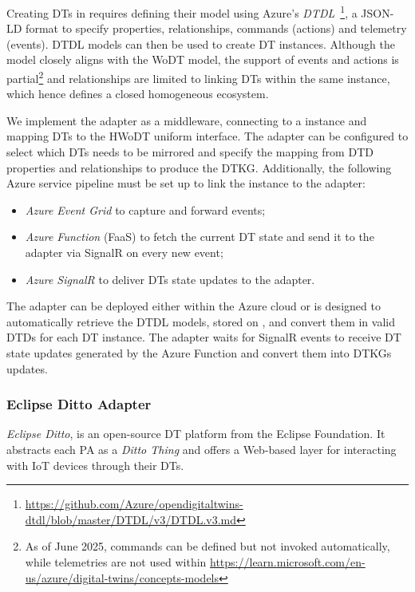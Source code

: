 Creating \acp{DT} in \azureTwin{} requires defining their model using Azure's \emph{\acf{DTDL}}~\footnote{\url{https://github.com/Azure/opendigitaltwins-dtdl/blob/master/DTDL/v3/DTDL.v3.md}}, a JSON-LD format to specify properties, relationships, commands (actions) and telemetry (events).
%
\ac{DTDL} models can then be used to create \ac{DT} instances.
%
Although the model closely aligns with the \ac{WoDT} model, the support of events and actions is partial\footnote{As of June 2025, commands can be defined but not invoked automatically, while telemetries are not used within \azureTwin{} \url{https://learn.microsoft.com/en-us/azure/digital-twins/concepts-models}} and relationships are limited to linking \acp{DT} within the same \azureTwin{} instance, which hence defines a closed homogeneous ecosystem.

We implement the \azureTwin{} adapter as a middleware, connecting to a \azureTwin{} instance and mapping \acp{DT} to the \ac{HWoDT} uniform interface.
%
The adapter can be configured to select which \acp{DT} needs to be mirrored and specify the mapping from \ac{DTD} properties and relationships to produce the \ac{DTKG}. 
Additionally, the following Azure service pipeline must be set up to link the \azureTwin{} instance to the adapter:
\begin{itemize}
    \item \textit{Azure Event Grid} to capture and forward \azureTwin{} events;
    \item \textit{Azure Function} (\acl{FaaS}) to fetch the current \ac{DT} state and send it to the adapter via SignalR on every new event;
    \item \textit{Azure SignalR} to deliver \acp{DT} state updates to the adapter.
\end{itemize}

The adapter can be deployed either within the Azure cloud or is designed to automatically retrieve the \ac{DTDL} models, stored on \azureTwin{}, and convert them in valid \acp{DTD} for each \ac{DT} instance.
The adapter waits for SignalR events to receive \ac{DT} state updates generated by the Azure Function and convert them into \acp{DTKG} updates.

\subsubsection{Eclipse Ditto Adapter}

\emph{Eclipse Ditto}, is an open-source \ac{DT} platform from the Eclipse Foundation. 
It abstracts each \ac{PA} as a \emph{Ditto Thing} and offers a Web-based layer for interacting with \ac{IoT} devices through their \acp{DT}.

